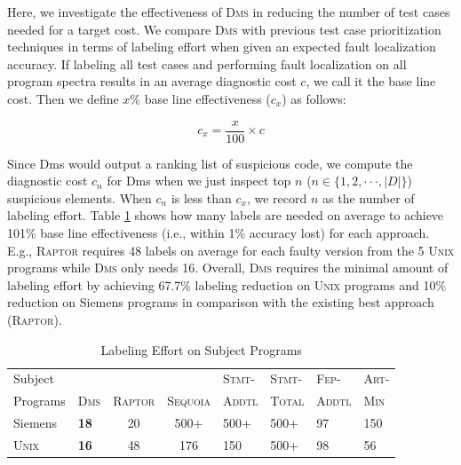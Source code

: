 
Here, we investigate the effectiveness of \textsc{Dms} in reducing the number of test cases needed for a target cost. We compare \textsc{Dms} with previous test case prioritization techniques in terms of labeling effort when given an expected fault localization accuracy.
If labeling all test cases and performing fault localization on all program spectra results in an average diagnostic cost $c$, we call it the base line cost. Then we define $x$\% base line effectiveness ($c_x$) as follows:

\begin{equation}\label{equation.accu_cost}
	c_{x} = \frac{x}{100} \times c
\end{equation}

Since Dms would output a ranking list of suspicious code, we compute the  diagnostic cost $c_n$ for Dms when we just inspect top $n$ ($n \in \{1,2,\cdot \cdot \cdot, |D|\}$) suspicious elements. When $c_n$ is less than $c_x$, we record $n$ as the number of labeling effort. Table \ref{tab:label_effort} shows how many labels are needed on average to achieve 101\% base line effectiveness (i.e., within 1\% accuracy lost) for each approach.
E.g., \textsc{Raptor} requires 48 labels on average for each faulty version from the 5 \textsc{Unix} programs while \textsc{Dms} only needs 16.
Overall, \textsc{Dms} requires the minimal amount of labeling effort by achieving 67.7\% labeling reduction on \textsc{Unix}
programs and 10\% reduction on Siemens programs in comparison with the existing best approach (\textsc{Raptor}).

\begin{table}[!htbp]
	\centering
	\caption{Labeling Effort on Subject Programs}
{
	\scriptsize
		\renewcommand{\arraystretch}{1.5}
        \begin{tabular}{|m{32pt}|m{13pt}|c|c|m{21pt}|m{21pt}|m{21pt}|m{17pt}|}
		   \hline
		     Subject &             &                &                  & \textsc{Stmt-} & \textsc{Stmt-} & \textsc{Fep-}  & \textsc{Art-} \\
		   Programs & \textsc{Dms} & \textsc{Raptor}  & \textsc{Sequoia} & \textsc{Addtl} & \textsc{Total} & \textsc{Addtl} & \textsc{Min} \\
		   \hline\hline
		   Siemens &   {\bf 18} &         20 &       500\tiny{+} &       500\tiny{+} &       500\tiny{+} &         97 &        150 \\
		   \hline
			\textsc{Unix} &   {\bf 16} &         48 &    176 &        150 &       500\tiny{+} &         98 &         56 \\
		   \hline
		\end{tabular}
}
	\label{tab:label_effort}
\end{table}


